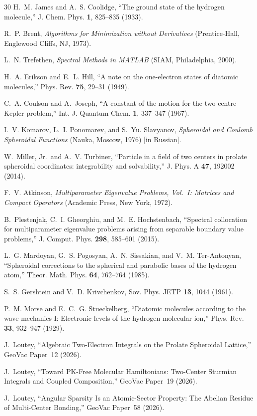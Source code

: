 \documentclass[aps,pra,twocolumn,superscriptaddress,longbibliography]{revtex4-2}
\begin{document}
\begin{thebibliography}{30}
H.~M. James and A.~S. Coolidge,
``The ground state of the hydrogen molecule,''
J. Chem. Phys. \textbf{1}, 825--835 (1933).

R.~P. Brent,
\textit{Algorithms for Minimization without Derivatives}
(Prentice-Hall, Englewood Cliffs, NJ, 1973).

L.~N. Trefethen,
\textit{Spectral Methods in MATLAB}
(SIAM, Philadelphia, 2000).

H.~A. Erikson and E.~L. Hill,
``A note on the one-electron states of diatomic molecules,''
Phys. Rev. \textbf{75}, 29--31 (1949).

C.~A. Coulson and A.~Joseph,
``A constant of the motion for the two-centre Kepler problem,''
Int. J. Quantum Chem. \textbf{1}, 337--347 (1967).

I.~V. Komarov, L.~I. Ponomarev, and S.~Yu. Slavyanov,
\textit{Spheroidal and Coulomb Spheroidal Functions}
(Nauka, Moscow, 1976) [in Russian].

W.~Miller, Jr.\ and A.~V. Turbiner,
``Particle in a field of two centers in prolate spheroidal coordinates:
integrability and solvability,''
J. Phys. A \textbf{47}, 192002 (2014).

F.~V. Atkinson,
\textit{Multiparameter Eigenvalue Problems, Vol.~I: Matrices and Compact
Operators} (Academic Press, New York, 1972).

B.~Plestenjak, C.~I. Gheorghiu, and M.~E. Hochstenbach,
``Spectral collocation for multiparameter eigenvalue problems arising
from separable boundary value problems,''
J. Comput. Phys. \textbf{298}, 585--601 (2015).

L.~G. Mardoyan, G.~S. Pogosyan, A.~N. Sissakian, and V.~M. Ter-Antonyan,
``Spheroidal corrections to the spherical and parabolic bases of the
hydrogen atom,''
Theor. Math. Phys. \textbf{64}, 762--764 (1985).

S.~S. Gershtein and V.~D. Krivchenkov,
Sov. Phys. JETP \textbf{13}, 1044 (1961).

P.~M. Morse and E.~C.~G. Stueckelberg,
``Diatomic molecules according to the wave mechanics I: Electronic
levels of the hydrogen molecular ion,''
Phys. Rev. \textbf{33}, 932--947 (1929).

J.~Loutey, ``Algebraic Two-Electron Integrals on the Prolate Spheroidal
Lattice,'' GeoVac Paper~12 (2026).

J.~Loutey, ``Toward PK-Free Molecular Hamiltonians: Two-Center Sturmian
Integrals and Coupled Composition,'' GeoVac Paper~19 (2026).

J.~Loutey, ``Angular Sparsity Is an Atomic-Sector Property: The Abelian
Residue of Multi-Center Bonding,'' GeoVac Paper~58 (2026).

\end{thebibliography}
\end{document}
